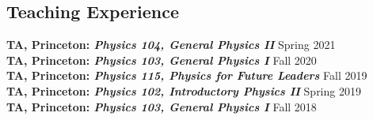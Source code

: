 \documentclass[margin,line,11pt]{resume}
\edef\hc{\string:} %
\begin{document}
\begin{resume}

\vspace{2mm}
\section{\mysidestyle Teaching Experience}
\textbf{TA, Princeton\hc{} \textit{Physics 104, General Physics II}} \hfill Spring 2021\vspace{2mm}\\
\textbf{TA, Princeton\hc{} \textit{Physics 103, General Physics I}} \hfill Fall 2020\vspace{2mm}\\
\textbf{TA, Princeton\hc{} \textit{Physics 115, Physics for Future Leaders}} \hfill Fall 2019\vspace{2mm}\\
\textbf{TA, Princeton\hc{} \textit{Physics 102, Introductory Physics II}} \hfill Spring 2019\vspace{2mm}\\
\textbf{TA, Princeton\hc{} \textit{Physics 103, General Physics I}} \hfill Fall 2018\\

\vspace{2mm}

\end{resume}
\end{document}
